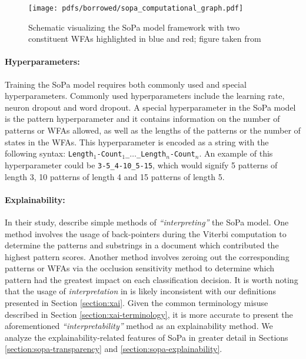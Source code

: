 \begin{figure}[t]
  \centering
  \texttt{[image: pdfs/borrowed/sopa\_computational\_graph.pdf]}
  \caption{Schematic visualizing the SoPa model framework with two constituent
    WFAs highlighted in blue and red; figure taken from
    \citet{schwartz2018sopa}}
  \label{fig:sopa}
\end{figure}

\paragraph{Hyperparameters:} Training the SoPa model requires both commonly used
and special hyperparameters. Commonly used hyperparameters include the learning
rate, neuron dropout and word dropout. A special hyperparameter in the SoPa
model is the pattern hyperparameter and it contains information on the number of
patterns or WFAs allowed, as well as the lengths of the patterns or the number
of states in the WFAs. This hyperparameter is encoded as a string with the
following syntax:
\texttt{Length$_{1}$-Count$_{1}$\_$\dots$\_Length$_{n}$-Count$_{n}$}. An example
of this hyperparameter could be \texttt{3-5\_4-10\_5-15}, which would signify 5
patterns of length 3, 10 patterns of length 4 and 15 patterns of length 5.

\paragraph{Explainability:} In their study, \citet[Page 7, Section
7]{schwartz2018sopa} describe simple methods of \textit{``interpreting''} the
SoPa model. One method involves the usage of back-pointers during the Viterbi
computation to determine the patterns and substrings in a document which
contributed the highest pattern scores. Another method involves zeroing out the
corresponding patterns or WFAs via the occlusion sensitivity method to determine
which pattern had the greatest impact on each classification decision. It is
worth noting that the usage of \textit{interpretation} in
\citet{schwartz2018sopa} is likely inconsistent with our definitions presented
in Section \ref{section:xai}. Given the common terminology misuse described in
Section \ref{section:xai-terminology}, it is more accurate to present the
aforementioned \textit{``interpretability''} method as an explainability method.
We analyze the explainability-related features of SoPa in greater detail in
Sections \ref{section:sopa-transparency} and \ref{section:sopa-explainability}.

